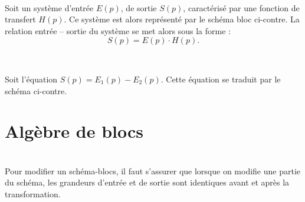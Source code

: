 \documentclass[10pt,fleqn]{article} %
\begin{document}
\begin{defi} ~\\

\noindent \begin{minipage}[c]{.75\linewidth}
Soit un système d'entrée $E(p)$, de sortie $S(p)$, caractérisé par une fonction
de transfert $H(p)$. Ce système est alors représenté par le schéma bloc ci-contre.
La relation entrée -- sortie du système se met alors sous la forme : 
$$
S(p) = E(p) \cdot H(p).
$$
\end{minipage} \hfill
\begin{minipage}[c]{.2\linewidth}
\begin{center}
\end{center}
\end{minipage}

\end{defi}

\begin{defi} ~\\
\noindent \begin{minipage}[c]{.65\linewidth}
Soit l'équation $S(p)=E_1(p)-E_2(p)$. Cette équation se traduit par le schéma ci-contre.
\end{minipage} \hfill
\begin{minipage}[c]{.3\linewidth}
\begin{center}

\end{center}
\end{minipage}


\end{defi}


\section{Algèbre de blocs}


\begin{warn}~\\
Pour modifier un schéma-blocs, il faut s'assurer que lorsque on modifie une partie du schéma, les grandeurs d'entrée et de sortie sont identiques avant et après la transformation.
\end{warn}
\end{document}
